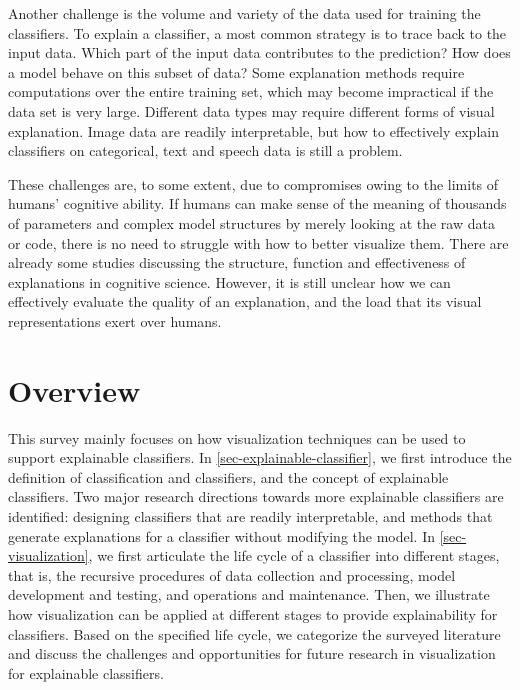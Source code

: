 Another challenge is the volume and variety of the data used for training the classifiers. To explain a classifier, a most common strategy is to trace back to the input data. Which part of the input data contributes to the prediction? How does a model behave on this subset of data? Some explanation methods require computations over the entire training set, which may become impractical if the data set is very large. Different data types may require different forms of visual explanation. Image data are readily interpretable, but how to effectively explain classifiers on categorical, text and speech data is still a problem.

These challenges are, to some extent, due to compromises owing to the limits of humans' cognitive ability. If humans can make sense of the meaning of thousands of parameters and complex model structures by merely looking at the raw data or code, there is no need to struggle with how to better visualize them. There are already some studies discussing the structure, function and effectiveness of explanations in cognitive science. However, it is still unclear how we can effectively evaluate the quality of an explanation, and the load that its visual representations exert over humans.


\section{Overview}

This survey mainly focuses on how visualization techniques can be used to support explainable classifiers. In \autoref{sec-explainable-classifier}, we first introduce the definition of classification and classifiers, and the concept of explainable classifiers. Two major research directions towards more explainable classifiers are identified: designing classifiers that are readily interpretable, and methods that generate explanations for a classifier without modifying the model. In \autoref{sec-visualization}, we first articulate the life cycle of a classifier into different stages, that is, the recursive procedures of data collection and processing, model development and testing, and operations and maintenance. Then, we illustrate how visualization can be applied at different stages to provide explainability for classifiers. Based on the specified life cycle, we categorize the surveyed literature and discuss the challenges and opportunities for future research in visualization for explainable classifiers.

\newpage

